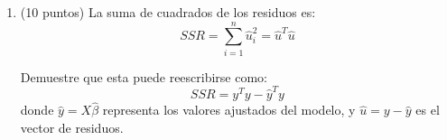 \documentclass[10pt,a4paper]{article}
\begin{document}
\begin{enumerate}




\item (10 puntos) La  suma de cuadrados de los residuos es:
    \[
    SSR = \sum_{i=1}^{n} \hat{u}_i^2 = \hat{u}^T \hat{u}
    \]
    
Demuestre que esta puede reescribirse como:
    \[
    SSR = y^T y - \hat{y}^T y
    \]
    donde \( \hat{y} = X \hat{\beta} \) representa los valores ajustados del modelo, y \( \hat{u} = y - \hat{y} \) es el vector de residuos.

\end{enumerate}
\end{document}
